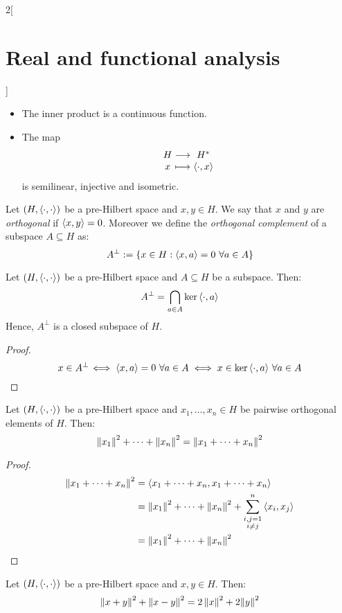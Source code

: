 \documentclass[../../../main_math.tex]{subfiles}
\begin{document}
\begin{multicols}{2}[\section{Real and functional analysis}]
\begin{proposition}
\begin{itemize}
      \item The inner product is a continuous function.
      \item The map $$\function{}{H}{H^*}{x}{\dotp{\cdot}{x}}$$ is semilinear, injective and isometric.
    \end{itemize}
  \end{proposition}
  \begin{definition}
    Let $(H,{\left\langle\cdot,\cdot\right\rangle})$ be a pre-Hilbert space and $x,y\in H$. We say that $x$ and $y$ are \emph{orthogonal} if ${\left\langle x,y\right\rangle}=0$. Moreover we define the \emph{orthogonal complement} of a subspace $A\subseteq H$ as: $$A^\perp:=\{x\in H:\dotp{x}{a}=0\ \forall a\in A\}$$
  \end{definition}
  \begin{lemma}
    Let $(H,{\left\langle\cdot,\cdot\right\rangle})$ be a pre-Hilbert space and $A\subseteq H$ be a subspace. Then: $$A^\perp=\bigcap_{a\in A}\ker{\left\langle\cdot,a\right\rangle}$$
    Hence, $A^\perp$ is a closed subspace of $H$.
  \end{lemma}
  \begin{proof}
    $$x\in A^\perp\!\iff {\left\langle x,a\right\rangle}=0\ \forall a\in A\iff x\in\ker{\left\langle\cdot,a\right\rangle}\ \forall a\in A$$
  \end{proof}
  \begin{proposition}\label{RFA:pythagorean}
    Let $(H,{\left\langle\cdot,\cdot\right\rangle})$ be a pre-Hilbert space and $x_1,\ldots, x_n\in H$ be pairwise orthogonal elements of $H$. Then: $${\left\|x_1\right\|}^2+\cdots + {\left\|x_n\right\|}^2={\left\|x_1+\cdots+x_n\right\|}^2$$
  \end{proposition}
  \begin{proof}
    \begin{align*}
      {\left\|x_1+\cdots+x_n\right\|}^2 & = {\left\langle x_1+\cdots+x_n,x_1+\cdots+x_n\right\rangle}                       \\
                                & ={\left\|x_1\right\|}^2+\cdots + {\left\|x_n\right\|}^2+\sum_{\substack{i,j=1 \\i\ne j}}^n{\left\langle x_i,x_j\right\rangle}\\
                                & ={\left\|x_1\right\|}^2+\cdots + {\left\|x_n\right\|}^2
    \end{align*}
  \end{proof}
  \begin{lemma}\label{RFA:parallelogram}
    Let $(H,{\left\langle\cdot,\cdot\right\rangle})$ be a pre-Hilbert space and $x,y\in H$. Then: $$\left\|x+y\right\|^2+{\left\|x-y\right\|}^2=2\left\|x\right\|^2+2{\left\|y\right\|}^2$$
  \end{lemma}
  \begin{definition}

\end{definition}
\end{multicols}
\end{document}
